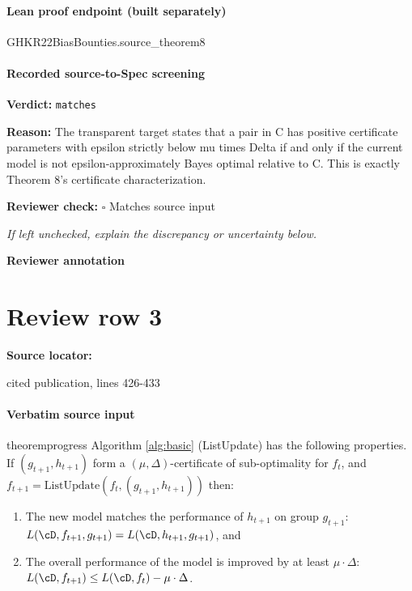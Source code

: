 \documentclass[10pt]{article}
\newcommand{\reviewerbox}{%
  \par\noindent\fbox{\parbox{0.96\linewidth}{\rule{0pt}{0.38in}}}\par
}
\newcommand{\reviewmatch}[1]{%
  \par\noindent\textbf{Reviewer check:} $\square$\; #1\par
  \noindent\emph{If left unchecked, explain the discrepancy or uncertainty below.}\par
}
\begin{document}
\paragraph{Lean proof endpoint (built separately)}\begin{ReviewVerbatim}
GHKR22BiasBounties.source_theorem8
\end{ReviewVerbatim}

\paragraph{Recorded source-to-Spec screening}
\textbf{Verdict:} \texttt{matches}
\\
{\raggedright
\textbf{Reason:} The transparent target states that a pair in C has positive certificate parameters with epsilon strictly below mu times Delta if and only if the current model is not epsilon-\allowbreak{}approximately Bayes optimal relative to C.\allowbreak{} This is exactly Theorem 8's certificate characterization.\allowbreak{}
\par}
\reviewmatch{Matches source input}
\noindent\textbf{Reviewer annotation}\par
\reviewerbox
\clearpage
\hypertarget{source-claim-d3e46ba690488c06}{}
\section*{Review row 3}
\textbf{Source locator:} {\footnotesize\raggedright cited publication, lines 426-\allowbreak{}433\par}
\paragraph{Verbatim source input}
\begin{ReviewVerbatim}
\begin{restatable}{theorem}{progress}
\label{thm:progress}
Algorithm \ref{alg:basic} (ListUpdate) has the following properties. If $(g_{t+1},h_{t+1})$ form a $(\mu,\Delta)$-certificate of sub-optimality for $f_{t}$, and $f_{t+1} = \textrm{ListUpdate}(f_t,(g_{t+1},h_{t+1}))$ then:
\begin{enumerate}
    \item The new model matches the performance of $h_{t+1}$ on group $g_{t+1}$: $L(\cD,f_{t+1},g_{t+1}) = L(\cD, h_{t+1},g_{t+1})$, and
    \item The overall performance of the model is improved by at least $\mu\cdot \Delta$: $L(\cD, f_{t+1}) \leq L(\cD, f_t) - \mu\cdot \Delta$.
\end{enumerate}
\end{restatable}
\end{ReviewVerbatim}
\end{document}
